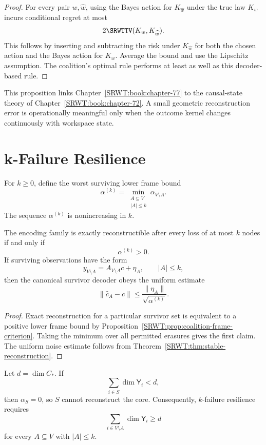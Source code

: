 \begin{proof}
For every pair \(w,\widehat w\), using the Bayes action for
\(K_{\widehat w}\) under the true law \(K_w\) incurs conditional regret at
most
\[
2\SRWTTV(K_w,K_{\widehat w}).
\]
This follows by inserting and subtracting the risk under
\(K_{\widehat w}\) for both the chosen action and the Bayes action for
\(K_w\). Average the bound and use the Lipschitz assumption. The coalition's
optimal rule performs at least as well as this decoder-based rule.
\end{proof}

This proposition links Chapter~\ref{SRWT:book:chapter-77} to the causal-state theory of Chapter~\ref{SRWT:book:chapter-72}. A small
geometric reconstruction error is operationally meaningful only when the
outcome kernel changes continuously with workspace state.

\section{k-Failure Resilience}

For \(k\geq0\), define the worst surviving lower frame bound
\[
\boxed{
\alpha^{(k)}
=
\min_{\substack{A\subseteq V\\|A|\leq k}}
\alpha_{V\setminus A}.
}
\]
The sequence \(\alpha^{(k)}\) is nonincreasing in \(k\).

\begin{SRWTtheorem}\label{SRWT:thm:uniform-erasure-resilience}
The encoding family is exactly reconstructible after every loss of at most
\(k\) nodes if and only if
\[
\boxed{\alpha^{(k)}>0.}
\]
If surviving observations have the form
\[
y_{V\setminus A}=A_{V\setminus A}c+\eta_A,
\qquad
|A|\leq k,
\]
then the canonical survivor decoder obeys the uniform estimate
\[
\boxed{
\|\widehat c_A-c\|
\leq
\frac{\|\eta_A\|}{\sqrt{\alpha^{(k)}}}.
}
\]
\end{SRWTtheorem}

\begin{proof}
Exact reconstruction for a particular survivor set is equivalent to a
positive lower frame bound by Proposition~\ref{SRWT:prop:coalition-frame-criterion}.
Taking the minimum over all permitted erasures gives the first claim. The
uniform noise estimate follows from Theorem~\ref{SRWT:thm:stable-reconstruction}.
\end{proof}

\begin{SRWTproposition}\label{SRWT:prop:dimension-obstruction}
Let \(d=\dim C_*\). If
\[
\sum_{i\in S}\dim \mathsf Y_i<d,
\]
then \(\alpha_S=0\), so \(S\) cannot reconstruct the core. Consequently,
\(k\)-failure resilience requires
\[
\sum_{i\in V\setminus A}\dim \mathsf Y_i\geq d
\]
for every \(A\subseteq V\) with \(|A|\leq k\).
\end{SRWTproposition}

